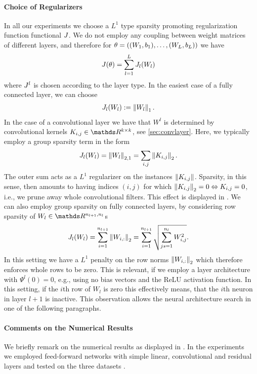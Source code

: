 \paragraph{Choice of Regularizers}
%
In all our experiments we choose a $L^1$ type sparsity promoting regularization function functional $J$. We do not employ any coupling between weight matrices of different layers, and therefore for $\theta=((W_1,b_1),\ldots, (W_L,b_L))$ we have
%
\begin{align*}
J(\theta) = \sum_{l=1}^L J_l(W_l)
\end{align*}
%
%
where $J^l$ is chosen according to the layer type. In the easiest case of a fully connected layer, we can choose
%
\begin{align*}
J_l(W_l) := \left\|W_l\right\|_1.
\end{align*}
%
In the case of a convolutional layer we have that $W^l$ is determined by convolutional kernels $K_{i,j}\in\R^{k\times k}$, see \cref{sec:convlayer}. Here, we typically employ a group sparsity term in the form
%
\begin{align*}
J_l(W_l) = \left\|W_l\right\|_{2,1} = \sum_{i,j} \left\|K_{i,j}\right\|_2.
\end{align*}
%
The outer sum acts as a $L^1$ regularizer on the instances $\left\|K_{i,j}\right\|$. Sparsity, in this sense, then amounts to having indices $(i,j)$ for which $\left\|K_{i,j}\right\|_2=0 \Leftrightarrow K_{i,j}=0$, i.e., we prune away whole convolutional filters. This effect is displayed in \cite[Fig. 1]{bungert2022bregman}.
We can also employ group sparsity on fully connected layers, by considering row sparsity of $W_l\in\R^{n_{l+1}, n_l}$s
%
\begin{align*}
J_l(W_l) = \sum_{i=1}^{n_{l+1}} \left\|W_{i,:}\right\|_2 = \sum_{i=1}^{n_{l+1}} \sqrt{\sum_{js=1}^{n_{l}} W_{i,j}^2}.
\end{align*}
%
%
%
In this setting we have a $L^1$ penalty on the row norms $\left\|W_{i,:}\right\|_2$ which therefore enforces whole rows to be zero. This is relevant, if we employ a layer architecture with $\Psi^l(0)=0$, e.g., using no bias vectors and the ReLU activation function. In this setting, if the $i$th row of $W_l$ is zero this effectively means, that the $i$th neuron in layer $l+1$ is inactive. This observation allows the neural architecture search in one of the following paragraphs.
\paragraph{Comments on the Numerical Results} We briefly remark on the numerical results as displayed in \cite[Sec. 4]{bungert2022bregman}. In the experiments we employed feed-forward networks with simple linear, convolutional and residual layers and tested on the three datasets \cite{krizhevsky2009learning, Han17, leCun10}.

